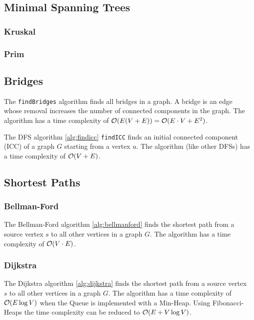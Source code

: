 \documentclass{article}
\begin{document}
\subsection{Minimal Spanning Trees}
\subsubsection{Kruskal}


\subsubsection{Prim}


\subsection{Bridges}
The \texttt{findBridges} algorithm finds all bridges in a graph. A bridge is an edge whose removal increases the number of connected components in the graph. The algorithm has a time complexity of $\mathcal{O}(E(V+E))=\mathcal{O}(E\cdot V+E^2)$.\par

The DFS algorithm \ref{alg:findicc} \texttt{findICC} finds an initial connected component (ICC) of a graph $G$ starting from a vertex $u$. The algorithm (like other DFSs) has a time complexity of $\mathcal{O}(V+E)$.\par

\subsection{Shortest Paths}


\subsubsection{Bellman-Ford}
The Bellman-Ford algorithm \ref{alg:bellmanford} finds the shortest path from a source vertex $s$ to all other vertices in a graph $G$. The algorithm has a time complexity of $\mathcal{O}(V\cdot E)$.\par


\subsubsection{Dijkstra}
The Dijkstra algorithm \ref{alg:dijkstra} finds the shortest path from a source vertex $s$ to all other vertices in a graph $G$. The algorithm has a time complexity of $\mathcal{O}(E\log V)$ when the Queue is implemented with a Min-Heap. Using Fibonacci-Heaps the time complexity can be reduced to $\mathcal{O}(E+V\log V)$.\par

\end{document}
